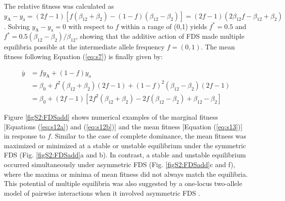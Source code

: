\documentclass[12pt,]{article}
\begin{document}
\noindent
The relative fitness was calculated as $y_\mathrm{A} - y_\mathrm{a} = (2f-1)[f(\beta_{12}+\beta_2) - (1-f)(\beta_{12}-\beta_2)] = (2f-1)(2\beta_{12}f-\beta_{12}+\beta_2)$. Solving $y_\mathrm{A} - y_\mathrm{a} = 0$ with respect to $f$ within a range of (0,1) yields $f^*=0.5$ and $f^*=0.5(\beta_{12}-\beta_2)/\beta_{12}$, showing that the additive action of FDS made multiple equilibria possible at the intermediate allele frequency $f = (0,1)$. The mean fitness following Equation (\ref{eq:s7}) is finally given by:

\begin{equation}
\begin{split}
\bar{y} &= fy_\mathrm{A} + (1-f)y_\mathrm{a} \\
&= \beta_0 + f^2(\beta_{12}+\beta_2)(2f-1) + (1-f)^2(\beta_{12}-\beta_2)(2f-1)\\
&= \beta_0 + (2f-1)[2f^2(\beta_{12}+\beta_2)-2f(\beta_{12}-\beta_2)+\beta_{12}-\beta_2] \label{eq:s13}
\end{split}
\end{equation}

\noindent
Figure \ref{figS2:FDSadd} shows numerical examples of the marginal fitness [Equations (\ref{eq:s12a}) and (\ref{eq:s12b})] and the mean fitness [Equation (\ref{eq:s13})] in response to $f$. Similar to the case of complete dominance, the mean fitness was maximized or minimized at a stable or unstable equilibrium under the symmetric FDS (Fig. \ref{figS2:FDSadd}a and b). In contrast, a stable and unstable equilibrium occurred simultaneously under asymmetric FDS (Fig. \ref{figS2:FDSadd}c and f), where the maxima or minima of mean fitness did not always match the equilibria. This potential of multiple equilibria was also suggested by a one-locus two-allele model of pairwise interactions when it involved asymmetric FDS \citep{schneider_maximization_2008}. 
\end{document}
